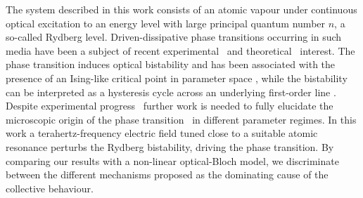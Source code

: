 \documentclass[twocolumn,aps,prl,nobibnotes,8pt]{revtex4-1}
\begin{document}
The system described in this work consists of an atomic vapour under continuous optical excitation to an energy level with large principal quantum number $n$, a so-called Rydberg level.
Driven-dissipative phase transitions occurring in such media have been a subject of recent experimental~\cite{Carr13, deMelo16, Weller16} and theoretical~\cite{Lee12, Lee11, Hu13} interest. 
The phase transition induces optical bistability and has been associated with the presence of an Ising-like critical point in parameter space \cite{Marcuzzi14b}, while the bistability can be interpreted as a hysteresis cycle across an underlying first-order line \cite{Weimer15, Weimer15b}.
Despite experimental progress~\cite{Weller16} further work  is needed to fully elucidate the microscopic origin of the phase transition~\cite{Sibalic16} in different parameter regimes.
In this work a terahertz-frequency electric field tuned close to a suitable atomic resonance perturbs the Rydberg bistability, driving the phase transition. 
By comparing our results with a non-linear optical-Bloch model, we discriminate between the different mechanisms proposed as the dominating cause of the collective behaviour.
\end{document}
